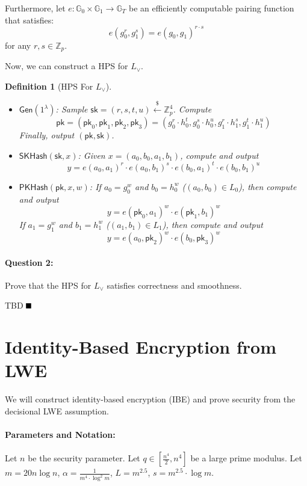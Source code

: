\documentclass[11pt]{article}
\newtheorem{definition}[theorem]{Definition}
\newenvironment{solution}{\color{blue}\noindent{\bf Solution}\hspace*{1em}}{\qed\medskip}
\newcommand{\qed}{\mbox{}\hspace*{\fill}\nolinebreak\mbox{$\rule{0.6em}{0.6em}$}} %
\numberwithin{equation}{section}
\newcommand{\bbG}{\mathbb{G}}
\newcommand{\bbZ}{\mathbb{Z}}
\newcommand{\Gen}{\mathsf{Gen}}
\newcommand{\pk}{\mathsf{pk}}
\newcommand{\sk}{\mathsf{sk}}
\newcommand{\secp}{\lambda}
\newcommand{\getsr}{\stackrel{\$}{\gets}}
\begin{document}
Furthermore, let $e : \bbG_0 \times \bbG_1 \to \bbG_T$ be an efficiently computable pairing function that satisfies:
\[e(g_0^r, g_1^s) = e(g_0, g_1)^{r \cdot s}\]
for any $r, s \in \bbZ_p$.

Now, we can construct a HPS for $L_\lor$.
\begin{definition}[HPS For $L_\lor$]\label{def:hps-for-OR-language}
$ $
\begin{itemize}
    \item $\Gen(1^\secp)$: Sample $\sk = (r, s, t, u) \getsr \bbZ_p^4$. Compute
    \[\pk = (\pk_0, \pk_1, \pk_2, \pk_3) = \left(g_0^{r} \cdot h_0^{t}, g_0^{s} \cdot h_0^{u}, g_1^{r} \cdot h_1^{s}, g_1^{t} \cdot h_1^{u}\right)\]
    Finally, output $(\pk, \sk)$.
    \item $\mathsf{SKHash}(\sk, x)$: Given $x = (a_0, b_0, a_1, b_1)$, compute and output
    \[y = e(a_0, a_1)^{r} \cdot e(a_0, b_1)^{s} \cdot e(b_0, a_1)^{t} \cdot e(b_0, b_1)^{u}\]
    \item $\mathsf{PKHash}(\pk, x, w)$: If $a_0 = g_0^w$ and $b_0 = h_0^w$ ($(a_0, b_0) \in L_0$), then compute and output
    \[y = e(\pk_0, a_1)^w \cdot e(\pk_1, b_1)^w\]
    If $a_1 = g_1^w$ and $b_1 = h_1^w$ ($(a_1, b_1) \in L_1$), then compute and output
    \[y = e(a_0, \pk_2)^w \cdot e(b_0, \pk_3)^w\]
\end{itemize}
\end{definition}

\paragraph{Question 2:} Prove that the HPS for $L_\lor$ satisfies correctness and smoothness.

\vspace{5mm}
\begin{solution}
TBD
\end{solution}

\pagebreak
\section{Identity-Based Encryption from LWE}
We will construct identity-based encryption (IBE) and prove security from the decisional LWE assumption.

\paragraph{Parameters and Notation:} 
Let $n$ be the security parameter. Let $q \in [\frac{n^4}{2}, n^4]$ be a large prime modulus. Let $m = 20 n \log n$, $\alpha = \frac{1}{m^4 \cdot \log^2 m}$, $L = m^{2.5}$, $s = m^{2.5} \cdot \log m$.
\end{document}

